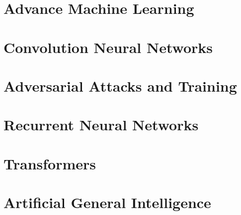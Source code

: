 \documentclass[12pt]{book}
\begin{document}
\part{Advance Machine Learning}
\part{Convolution Neural Networks}
\part{Adversarial Attacks and Training}

\part{Recurrent Neural Networks}
\part{Transformers}
\part{Artificial General Intelligence}


\backmatter


\end{document}
